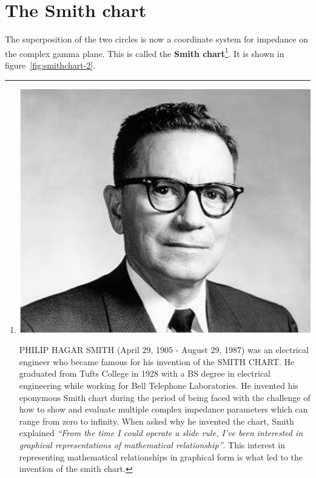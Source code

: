 \section{The Smith chart}
The superposition of the two circles is now a coordinate system for impedance on the complex gamma plane. This is called the \textbf{Smith chart}\footnote{
\includegraphics[scale=0.09]{./graphics/a21}

PHILIP HAGAR SMITH (April 29, 1905 - August 29, 1987) was an electrical engineer who became famous for his invention of the SMITH CHART. He graduated from Tufts College in 1928 with a BS degree in electrical engineering while working for Bell Telephone Laboratories. He invented his eponymous Smith chart during the period of being faced with the challenge of how to show and evaluate multiple complex impedance parameters which can range from zero to infinity. When asked why he invented the chart, Smith explained \emph{\textquotedblleft From the time I could operate a slide rule, I've been interested in graphical representations of mathematical relationship\textquotedblright}. This interest in representing mathematical relationships in graphical form is what led to the invention of the smith chart.
}. It is shown in figure~\ref{fig:smithchart-2}.
